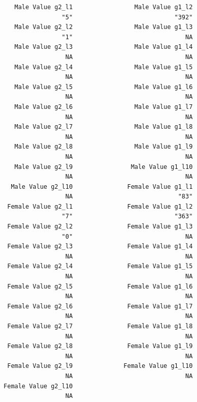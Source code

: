 \documentclass[12pt,a4paper]{article}
\begin{document}
\begin{verbatim}
                Male Value g2_l1                 Male Value g1_l2 
                             "5"                            "392" 
                Male Value g2_l2                 Male Value g1_l3 
                             "1"                               NA 
                Male Value g2_l3                 Male Value g1_l4 
                              NA                               NA 
                Male Value g2_l4                 Male Value g1_l5 
                              NA                               NA 
                Male Value g2_l5                 Male Value g1_l6 
                              NA                               NA 
                Male Value g2_l6                 Male Value g1_l7 
                              NA                               NA 
                Male Value g2_l7                 Male Value g1_l8 
                              NA                               NA 
                Male Value g2_l8                 Male Value g1_l9 
                              NA                               NA 
                Male Value g2_l9                Male Value g1_l10 
                              NA                               NA 
               Male Value g2_l10               Female Value g1_l1 
                              NA                             "83" 
              Female Value g2_l1               Female Value g1_l2 
                             "7"                            "363" 
              Female Value g2_l2               Female Value g1_l3 
                             "0"                               NA 
              Female Value g2_l3               Female Value g1_l4 
                              NA                               NA 
              Female Value g2_l4               Female Value g1_l5 
                              NA                               NA 
              Female Value g2_l5               Female Value g1_l6 
                              NA                               NA 
              Female Value g2_l6               Female Value g1_l7 
                              NA                               NA 
              Female Value g2_l7               Female Value g1_l8 
                              NA                               NA 
              Female Value g2_l8               Female Value g1_l9 
                              NA                               NA 
              Female Value g2_l9              Female Value g1_l10 
                              NA                               NA 
             Female Value g2_l10 
                              NA 
\end{verbatim}
\endgroup                            
\end{document}
